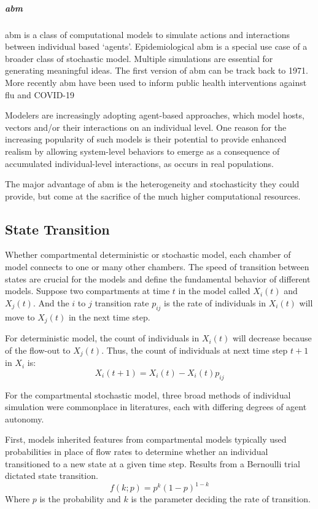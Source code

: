 \documentclass[a4paper, 12pt, twoside]{article}
\begin{document}
\subparagraph{\gls{abm}}
\gls{abm} is a class of computational models to simulate actions and interactions between individual based `agents'.
Epidemiological \gls{abm} is a special use case of a broader class of stochastic model.
Multiple simulations are essential for generating meaningful ideas.
The first version of \gls{abm} can be track back to 1971\cite{Schelling1971}.
More recently \gls{abm} have been used to inform public health interventions against flu\cite{Ferguson2006a, Ferguson2005} and COVID-19\cite{Maziarz2020, Ferguson2020, Chang2020}

Modelers are increasingly adopting agent-based approaches, which model hosts, vectors and/or their interactions on an individual level.
One reason for the increasing popularity of such models is their potential to provide enhanced realism by allowing system-level behaviors to emerge as a consequence of accumulated individual-level interactions, as occurs in real populations.

The major advantage of \gls{abm} is the heterogeneity and stochasticity they could provide, but come at the sacrifice of the much higher computational resources.

\subsection{State Transition}
Whether compartmental deterministic or stochastic model, each chamber of model connects to one or many other chambers.
The speed of transition between states are crucial for the models and define the fundamental behavior of different models.
Suppose two compartments at time $t$ in the model called $X_i(t)$ and $X_j(t)$. And the  $i$ to  $j$ transition rate  $p_{ij}$ is the rate of individuals in $X_i(t)$ will move to $X_j(t)$ in the next time step.

For deterministic model, the count of individuals in $X_i(t)$ will decrease because of the flow-out to $X_j(t)$.
Thus, the count of individuals at next time step $t+1$ in $X_i$ is:
\begin{equation}
  X_i(t+1) = X_i(t) - X_i(t)p_{ij}
\end{equation}

For the compartmental stochastic model, three broad methods of individual simulation were commonplace in literatures, each with differing degrees of agent autonomy.

First, models inherited features from compartmental models typically used probabilities in place of flow rates to determine whether an individual transitioned to a new state at a given time step.
Results from a Bernoulli trial dictated state transition.
\begin{equation}
	f(k;p) = p^k ( 1 - p )^{1 - k}
\end{equation}
Where $p$ is the probability and  $k$ is the parameter deciding the rate of transition.
\end{document}
